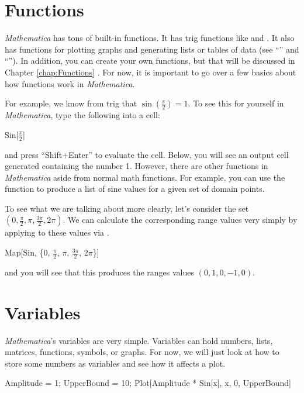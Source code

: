 \section{Functions}
\emph{Mathematica} has tons of built-in functions. It has trig functions like  and . It also has functions for plotting graphs and generating lists or tables of data (see ``'' and ``''). In addition, you can create your own functions, but that will be discussed in Chapter \ref{chap:Functions} . For now, it is important to go over a few basics about how functions work in \emph{Mathematica}.

For example, we know from trig that $\sin(\frac{\pi}{2}) = 1$. To see this for yourself in \emph{Mathematica}, type the following into a cell:

\begin{code}
	   Sin[$\frac{\pi}{2}$]
\end{code}
and press ``Shift+Enter'' to evaluate the cell. Below, you will see an output cell generated containing the number 1. However, there are other functions in \emph{Mathematica} aside from normal math functions. For example, you can use the  function to produce a list of sine values for a given set of domain points. 

To see what we are talking about more clearly, let's consider the set $(0, \frac{\pi}{2}, \pi, \frac{3\pi}{2}, 2\pi)$. We can calculate the corresponding range values very simply by applying  to these values via .

\begin{code}
	   Map[Sin, \{0, $\frac{\pi}{2}$, $\pi$, $\frac{3\pi}{2}$, $2\pi$\}]
\end{code}
and you will see that this produces the ranges values $(0, 1, 0, -1, 0)$.

\section{Variables}
\emph{Mathematica}'s variables are very simple. Variables can hold numbers, lists, matrices, functions, symbols, or graphs. For now, we will just look at how to store some numbers as variables and see how it affects a plot.

\begin{code}
	   Amplitude = 1;
	   UpperBound = 10;
	   Plot[Amplitude * Sin[x], {x, 0, UpperBound}]
\end{code}

